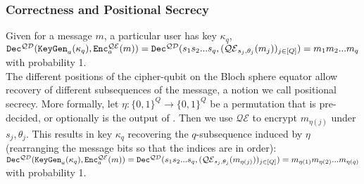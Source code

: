 \subsubsection*{Correctness and Positional Secrecy} 
Given for a message $m$, a particular user has key $\kappa_q$, \\
$\texttt{Dec}^{\mathcal{QD}}(\texttt{KeyGen}_a(\kappa_q),\texttt{Enc}^{\mathcal{QE}}_a(m)) 
= \texttt{Dec}^{\mathcal{QD}}(s_1s_2...s_q, (\mathcal{QE}_{s_j,\theta_j}(m_j))_{j \in [Q]}) \\
= m_1m_2...m_q$ with probability 1. \\
The different positions of the cipher-qubit on the Bloch sphere equator allow recovery of different subsequences of the message, a notion we call positional secrecy. More formally, let $\eta:\{0,1\}^Q \rightarrow \{0,1\}^Q$ be a permutation that is pre-decided, or optionally is the output of \setup. Then we use $\mathcal{QE}$ to encrypt $m_{\eta(j)}$ under $s_j,\theta_j$. This results in key $\kappa_q$ recovering the $q$-subsequence induced by $\eta$ (rearranging the message bits so that the indices are in order): \\
$\texttt{Dec}^{\mathcal{QD}}(\texttt{KeyGen}_a(\kappa_q),\texttt{Enc}^{\mathcal{QE}}_a(m)) 
= \texttt{Dec}^{\mathcal{QD}}(s_1s_2...s_q, (\mathcal{QE}_{s_j,\theta_j}(m_{\eta(j)}))_{j \in [Q]}) \\
= m_{\eta(1)}m_{\eta(2)}...m_{\eta(q)}$ with probability 1. \\



